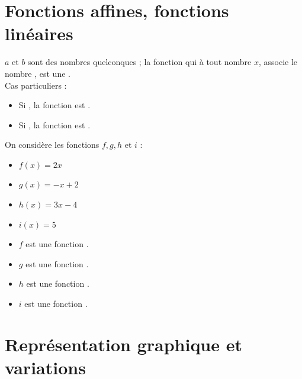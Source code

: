 \documentclass[12pt,a4paper]{article}
\date{}
\title{}
\begin{document}


\section{Fonctions affines, fonctions linéaires}


\begin{mydefs}
	
$a$ et $b$ sont des nombres quelconques ; la fonction qui à tout nombre $x$, associe le nombre , est une .\\
	
	
Cas particuliers :
\begin{itemize}
	\item Si , la fonction est .
	\item Si , la fonction est .
\end{itemize}
\end{mydefs}

\begin{myexs}
	On considère les fonctions $f,g,h$ et $i$ :
	\begin{multicols}{2}
		\begin{itemize}
			\item $f(x)=2x$
			\item $g(x)=-x+2$
			\item $h(x)=3x-4$
			\item $i(x)=5$
		\end{itemize}
	\end{multicols}
	
	\begin{itemize}
		\item $f$ est une fonction .
		\item $g$ est une fonction .
		\item $h$ est une fonction .
		\item $i$ est une fonction .
	\end{itemize}
\end{myexs}
	
\section{Représentation graphique et variations}
\end{document}
